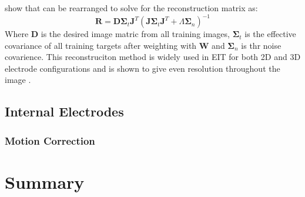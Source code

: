  show that  can 
be rearranged to solve for the reconstruction matrix
as:
\begin{equation} 
	\mathbf{R} = \mathbf{D}  
	\mathbf{\Sigma}_t \mathbf{J}^T(\mathbf{J}  
	 \mathbf{\Sigma}_t  \mathbf{J}^T + 
	 \Lambda \mathbf{\Sigma}_n)^{-1}
\end{equation}
Where $\mathbf{D}$ is the desired image matric from all training images,
$\mathbf{\Sigma}_t$  is the effective covariance of all training targets after weighting with 
$\mathbf{W}$ and 
$\mathbf{\Sigma}_n$ is thr noise covarience. 
This reconstruciton method is widely used in EIT for both 2D and 3D electrode configurations 
and is shown to give even resolution throughout the image \parencite{adler_greit_2009}.

\subsection{Internal Electrodes}
\subsubsection{Motion Correction} \label{sec:motion_correction}

\section{Summary}


